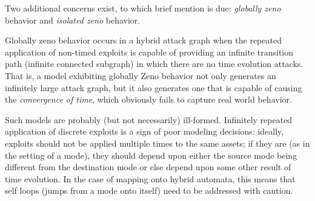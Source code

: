 Two additional concerns exist, to which brief mention is due: \emph{globally 
zeno} behavior and \emph{isolated zeno} behavior.

Globally zeno behavior occurs in a hybrid attack graph when the
repeated application of non-timed exploits is capable of providing an infinite
transition path (infinite connected subgraph) in which there are no time 
evolution attacks. That is, a model exhibiting globally Zeno behavior not only
generates an infinitely large attack graph, but it also generates one that is
capable of causing the \emph{convergence of time}, which obviously fails to
capture real world behavior.

Such models are probably (but
not necessarily) ill-formed. Infinitely repeated application of discrete
exploits is a sign of poor modeling decisions: ideally, exploits should not be
applied multiple times to the same assets; if they are (as in the setting of a
mode), they should depend upon either the source mode being different from the
destination mode or else depend upon some other result of time evolution. In the
case of mapping onto hybrid automata, this means that self loops (jumps from a
mode onto itself) need to be addressed with caution.

